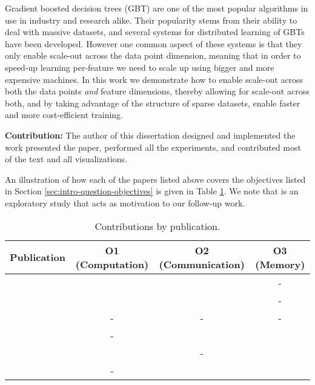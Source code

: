 \begin{itemize}
	Gradient boosted decision trees (GBT) are one of the most popular algorithms in
	use in industry and research alike. Their popularity stems from their ability
	to deal with massive datasets, and several systems for distributed learning
	of GBTs have been developed. However one common aspect of these systems is that
	they only enable scale-out across the data point dimension, meaning that in
	order to speed-up learning per-feature we need to scale up using bigger and more
	expensive machines. In this work we demonstrate how to enable scale-out across
	both the data points \emph{and} feature dimensions, thereby allowing for scale-out
	across both, and by taking advantage of the structure of sparse datasets,
	enable faster and more cost-efficient training.

	\textbf{Contribution:} The author of this dissertation designed and implemented the
	work presented the paper, performed all the experiments, and contributed most of the text and all visualizations.
\end{itemize}

An illustration of how each of the papers listed above covers the
objectives listed in Section \ref{sec:intro-question-objectives} is given
in Table \ref{tab:papers-objectives}. We note that \sessionlength is an exploratory study that acts as motivation to our follow-up work.

\begin{table}
	\centering
	\begin{tabular}{l c c c}
		\toprule
		Publication & O1 (Computation) & O2 (Communication) & O3 (Memory) \\
		\midrule
		\conceptsicdm & \checkmark  & \checkmark  & - \\

		\conceptskais &  \checkmark  & \checkmark  & - \\

		\sessionlength & - & - & - \\

		\boostvht & - & \checkmark & \checkmark \\

		\uncertaintrees & \checkmark & - & \checkmark \\

		\blockgbt & - & \checkmark & \checkmark \\
		\bottomrule
	\end{tabular}
	\caption{Contributions by publication.}
	\label{tab:papers-objectives}
\end{table}

